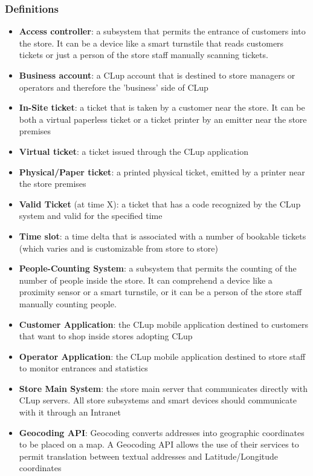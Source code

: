 \subsubsection{Definitions}
\begin{itemize}
      \item \textbf{Access controller}: a subsystem that permits the entrance of customers into the store. It can be a device like a smart turnstile that reads customers tickets or just a person of the store staff manually scanning tickets.
      \item \textbf{Business account}: a CLup account that is destined to store managers or operators and therefore the 'business' side of CLup
      \item \textbf{In-Site ticket}: a ticket that is taken by a customer near the store. It can be both a virtual paperless ticket or a ticket printer by an emitter near the store premises
      \item \textbf{Virtual ticket}: a ticket issued through the CLup application
      \item \textbf{Physical/Paper ticket}: a printed physical ticket, emitted by a printer near the store premises
      \item \textbf{Valid Ticket} (at time X): a ticket that has a code recognized by the CLup system and valid for the specified time
      \item \textbf{Time slot}: a time delta that is associated with a number of bookable tickets (which varies and is customizable from store to store)
      \item \textbf{People-Counting System}: a subsystem that permits the counting of the number of people inside the store. It can comprehend a device like a proximity sensor or a smart turnstile, or it can be a person of the store staff manually counting people.
      \item \textbf{Customer Application}: the CLup mobile application destined to customers that want to shop inside stores adopting CLup
      \item \textbf{Operator Application}: the CLup mobile application destined to store staff to monitor entrances and statistics
      \item \textbf{Store Main System}: the store main server that communicates directly with CLup servers. All store subsystems and smart devices should communicate with it through an Intranet
      \item \textbf{Geocoding API}: Geocoding converts addresses into geographic coordinates to be placed on a map. A Geocoding API allows the use of their services to permit translation between textual addresses and Latitude/Longitude coordinates

\end{itemize}
